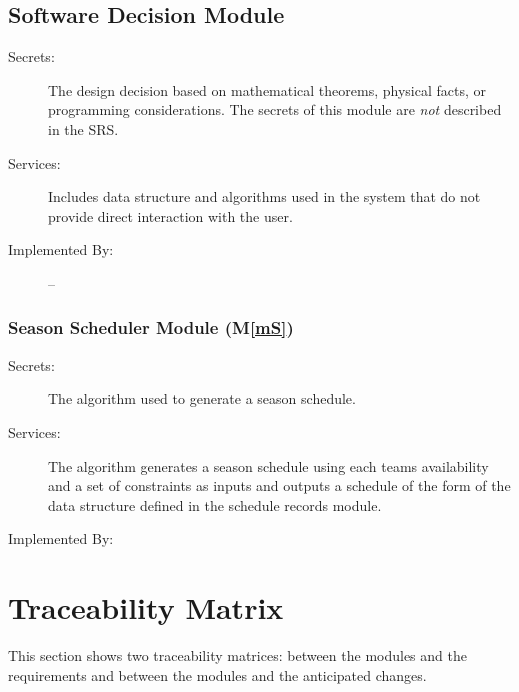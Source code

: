 \documentclass[12pt, titlepage]{article}
\newcommand{\mref}[1]{M\ref{#1}}
\begin{document}
\subsection{Software Decision Module}

\begin{description}
  \item[Secrets:] The design decision based on mathematical theorems, physical
  facts, or programming considerations. The secrets of this module are
  \emph{not} described in the SRS.
  \item[Services:] Includes data structure and algorithms used in the system that
  do not provide direct interaction with the user. 
  \item[Implemented By:] --
\end{description}

\subsubsection{Season Scheduler Module (\mref{mS})}

\begin{description}
  \item[Secrets:]The algorithm used to generate a season schedule.
  \item[Services:]The algorithm generates a season schedule using each teams
  availability and a set of constraints as inputs and outputs a schedule of
  the form of the data structure defined in the schedule records module.
  \item[Implemented By:] \progname{}
\end{description}

\section{Traceability Matrix} \label{SecTM}

This section shows two traceability matrices: between the modules and the
requirements and between the modules and the anticipated changes.
\end{document}
